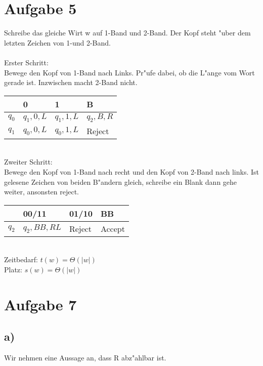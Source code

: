 \documentclass[a4paper,11pt]{scrartcl}
\begin{document}
\section*{Aufgabe 5}

Schreibe das gleiche Wirt w auf 1-Band und 2-Band. Der Kopf steht "uber dem letzten Zeichen von 1-und 2-Band. \\ \ \\
Erster Schritt:\\
Bewege den Kopf von 1-Band nach Links. Pr"ufe dabei, ob die L"ange vom Wort gerade ist. Inzwischen macht 2-Band nicht.


\begin{table}[h!]
	\begin{tabular}{|l|l|l|l|}
		\hline
		& 0         & 1         & B         \\ \hline
		$q_0$ & $q_1,0,L$ & $q_1,1,L$ & $q_2,B,R$ \\ \hline
		$q_1$ & $q_0,0,L$ & $q_0,1,L$ & Reject    \\ \hline
	\end{tabular}
\end{table}
\ \\
Zweiter Schritt:\\
Bewege den Kopf von 1-Band nach recht und den Kopf von 2-Band nach links. Ist gelesene Zeichen von beiden B"andern gleich, schreibe ein Blank dann gehe weiter, ansonsten reject.


\begin{table}[h!]
	\begin{tabular}{|l|l|l|l|}
		\hline
		& 00/11      & 01/10  & BB     \\ \hline
		$q_2$ & $q_2,BB,RL$ & Reject & Accept \\ \hline
	\end{tabular}
\end{table}

\ \\
Zeitbedarf: $t(w)=\Theta (|w|)$\\
Platz: $s(w)=\Theta (|w|)$

	
\section*{Aufgabe 7}

\subsection*{a)}

	Wir nehmen eine Aussage an, dass R abz"ahlbar ist.\\ 
\end{document}
